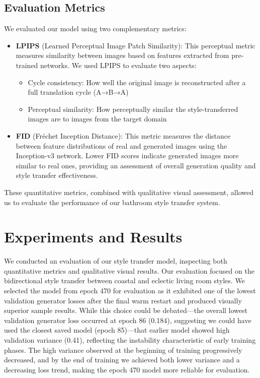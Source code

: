 \documentclass[twocolumn,superscriptaddress,aps]{revtex4-1}
\begin{document}
\subsection{Evaluation Metrics}

We evaluated our model using two complementary metrics:

\begin{itemize}
    \item \textbf{LPIPS} (Learned Perceptual Image Patch Similarity): This perceptual metric measures similarity between images based on features extracted from pre-trained networks. We used LPIPS to evaluate two aspects:
    \begin{itemize}
        \item Cycle consistency: How well the original image is reconstructed after a full translation cycle (A→B→A)
        \item Perceptual similarity: How perceptually similar the style-transferred images are to images from the target domain
    \end{itemize}
    
    \item \textbf{FID} (Fréchet Inception Distance): This metric measures the distance between feature distributions of real and generated images using the Inception-v3 network. Lower FID scores indicate generated images more similar to real ones, providing an assessment of overall generation quality and style transfer effectiveness.
\end{itemize}

These quantitative metrics, combined with qualitative visual assessment, allowed us to evaluate the performance of our bathroom style transfer system.

\section{Experiments and Results}

We conducted an evaluation of our style transfer model, inspecting both quantitative metrics and qualitative visual results. Our evaluation focused on the bidirectional style transfer between coastal and eclectic living room styles. We selected the model from epoch 470 for evaluation as it exhibited one of the lowest validation generator losses after the final warm restart and produced visually superior sample results. While this choice could be debated—the overall lowest validation generator loss occurred at epoch 86 (0.184), suggesting we could have used the closest saved model (epoch 85)—that earlier model showed high validation variance (0.41), reflecting the instability characteristic of early training phases. The high variance observed at the beginning of training progressively decreased, and by the end of training we achieved both lower variance and a decreasing loss trend, making the epoch 470 model more reliable for evaluation.
\end{document}
